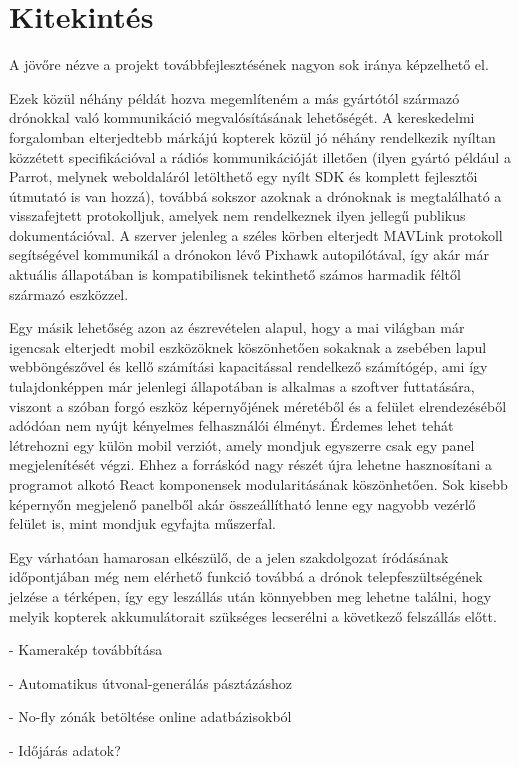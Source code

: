\section{Kitekintés}

A jövőre nézve a projekt továbbfejlesztésének nagyon sok iránya képzelhető el.

Ezek közül néhány példát hozva megemlíteném a más gyártótól származó drónokkal
való kommunikáció megvalósításának lehetőségét. A kereskedelmi forgalomban
elterjedtebb márkájú kopterek közül jó néhány rendelkezik nyíltan közzétett
specifikációval a rádiós kommunikációját illetően (ilyen gyártó például a
Parrot, melynek weboldaláról letölthető egy nyílt SDK és komplett fejlesztői
útmutató is van hozzá), továbbá sokszor azoknak a drónoknak is megtalálható a
visszafejtett protokolljuk, amelyek nem rendelkeznek ilyen jellegű publikus
dokumentációval. A szerver jelenleg a széles körben elterjedt MAVLink protokoll
segítségével kommunikál a drónokon lévő Pixhawk autopilótával, így akár már
aktuális állapotában is kompatibilisnek tekinthető számos harmadik féltől
származó eszközzel.

Egy másik lehetőség azon az észrevételen alapul, hogy a mai világban már
igencsak elterjedt mobil eszközöknek köszönhetően sokaknak a zsebében lapul
webböngészővel és kellő számítási kapacitással rendelkező számítógép, ami így
tulajdonképpen már jelenlegi állapotában is alkalmas a szoftver futtatására,
viszont a szóban forgó eszköz képernyőjének méretéből és a felület
elrendezéséből adódóan nem nyújt kényelmes felhasználói élményt. Érdemes lehet
tehát létrehozni egy külön mobil verziót, amely mondjuk egyszerre csak egy panel
megjelenítését végzi. Ehhez a forráskód nagy részét újra lehetne hasznosítani a
programot alkotó React komponensek modularitásának köszönhetően. Sok kisebb
képernyőn megjelenő panelből akár összeállítható lenne egy nagyobb vezérlő
felület is, mint mondjuk egyfajta műszerfal.

Egy várhatóan hamarosan elkészülő, de a jelen szakdolgozat íródásának
időpontjában még nem elérhető funkció továbbá a drónok telepfeszültségének
jelzése a térképen, így egy leszállás után könnyebben meg lehetne találni, hogy
melyik kopterek akkumulátorait szükséges lecserélni a következő felszállás
előtt.

- Kamerakép továbbítása

- Automatikus útvonal-generálás pásztázáshoz

- No-fly zónák betöltése online adatbázisokból

- Időjárás adatok?
